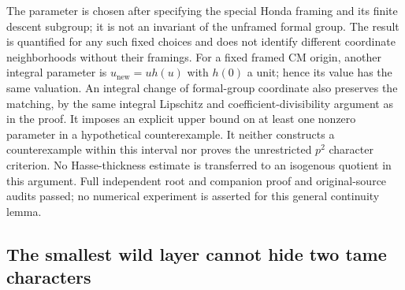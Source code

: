 \begin{remark}
\label{rem:B-RD54-scope}
The parameter is chosen after specifying the special Honda
framing and its finite descent subgroup; it is not an invariant
of the unframed formal group. The result is quantified for
any such fixed choices and does not identify different
coordinate neighborhoods without their framings.
For a fixed framed CM origin, another integral parameter is
$u_{\mathrm{new}}=u h(u)$ with $h(0)$ a unit; hence its value
has the same valuation. An integral change of formal-group
coordinate also preserves the matching, by the same integral
Lipschitz and coefficient-divisibility argument as in the proof.
It imposes an explicit upper bound on at least one nonzero
parameter in a hypothetical counterexample. It neither
constructs a counterexample within this interval nor proves
the unrestricted $p^2$ character criterion.
No Hasse-thickness estimate is transferred to an isogenous
quotient in this argument. Full independent root and companion
proof and original-source audits passed; no numerical
experiment is asserted for this general continuity lemma.
\end{remark}


\subsection{The smallest wild layer cannot hide two tame characters}

